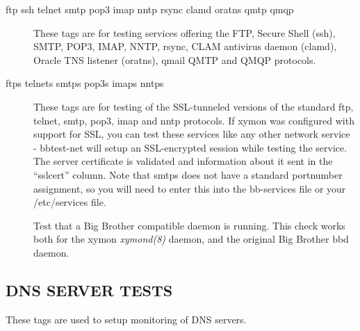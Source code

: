  \begin{description}
\item[ftp ssh telnet smtp pop3 imap nntp rsync clamd oratns qmtp qmqp]
  These tags are for testing services offering the FTP, Secure Shell
  (ssh), SMTP, POP3, IMAP, NNTP, rsync, CLAM antivirus daemon (clamd),
  Oracle TNS listener (oratns), qmail QMTP and QMQP protocols. 


 

\item[ftps telnets smtps pop3s imaps nntps] These tags are for testing
  of the SSL-tunneled versions of the standard ftp, telnet, smtp,
  pop3, imap and nntp protocols. If xymon was configured with support
  for SSL, you can test these services like any other network service
  - bbtest-net will setup an SSL-encrypted session while testing the
  service. The server certificate is validated and information about
  it sent in the ``sslcert'' column. Note that smtps does not have a
  standard portnumber assignment, so you will need to enter this into
  the bb-services file or your /etc/services file. 


 

\item[] Test that a Big Brother compatible daemon is running. This
  check works both for the xymon \emph{xymond(8)} daemon, and the
  original Big Brother bbd daemon. 


 


 


\end{description}

\subsection{DNS SERVER TESTS}
 These tags are used to setup monitoring of DNS servers. 

